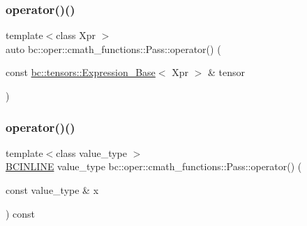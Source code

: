 \mbox{\label{structbc_1_1oper_1_1cmath__functions_1_1Pass_a081139c35d90e67100436fab28c93f7f}} 
\subsubsection{\texorpdfstring{operator()()}{operator()()}\hspace{0.1cm}{\footnotesize\ttfamily [2/3]}}
{\footnotesize\ttfamily template$<$class Xpr $>$ \\
auto bc\+::oper\+::cmath\+\_\+functions\+::\+Pass\+::operator() (\begin{DoxyParamCaption}\item[{const \hyperlink{classbc_1_1tensors_1_1Expression__Base}{bc\+::tensors\+::\+Expression\+\_\+\+Base}$<$ Xpr $>$ \&}]{tensor }\end{DoxyParamCaption})\hspace{0.3cm}{\ttfamily [inline]}}

\mbox{\label{structbc_1_1oper_1_1cmath__functions_1_1Pass_ae36754a7d9f80cd8c6abbcc098e73d0c}} 
\subsubsection{\texorpdfstring{operator()()}{operator()()}\hspace{0.1cm}{\footnotesize\ttfamily [3/3]}}
{\footnotesize\ttfamily template$<$class value\+\_\+type $>$ \\
\hyperlink{common_8h_a6699e8b0449da5c0fafb878e59c1d4b1}{B\+C\+I\+N\+L\+I\+NE} value\+\_\+type bc\+::oper\+::cmath\+\_\+functions\+::\+Pass\+::operator() (\begin{DoxyParamCaption}\item[{const value\+\_\+type \&}]{x }\end{DoxyParamCaption}) const\hspace{0.3cm}{\ttfamily [inline]}}



